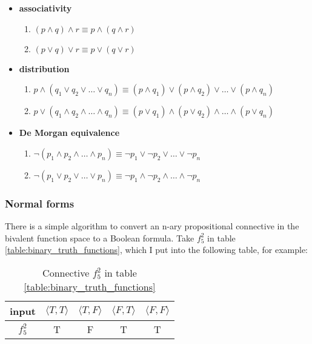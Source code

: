 \documentclass[12pt, letterpaper]{article}
\begin{document}
\begin{itemize}
  \item \textbf{associativity}
    \begin{enumerate}
      \item $(p \land q) \land r \equiv p \land (q \land r)$
      \item $(p \lor q) \lor r \equiv p \lor (q \lor r)$
    \end{enumerate}
  \item \textbf{distribution}
    \begin{enumerate}
      \item $p \land (q_1 \lor q_2 \lor \ldots \lor q_n) \equiv (p \land q_1)
        \lor (p \land q_2) \lor \ldots \lor (p \land q_n)$
      \item $p \lor (q_1 \land q_2 \land \ldots \land q_n) \equiv (p \lor q_1)
        \land (p \lor q_2) \land \ldots \land (p \lor q_n)$
    \end{enumerate}
  \item \textbf{De Morgan equivalence}
    \begin{enumerate}
      \item $\lnot (p_1 \land p_2 \land \ldots \land p_n) \equiv \lnot p_1
        \lor \lnot p_2 \lor \ldots \lor \lnot p_n$
      \item $\lnot (p_1 \lor p_2 \lor \ldots \lor p_n) \equiv \lnot p_1
        \land \lnot p_2 \land \ldots \land \lnot p_n$
    \end{enumerate}
\end{itemize}

\subsubsection{Normal forms}

There is a simple algorithm to convert an n-ary propositional connective in the
bivalent function space to a Boolean formula. Take $f_5^2$ in table
\ref{table:binary_truth_functions}, which I put into the following table, for
example:

\begin{table}[H]
  \centering
  \begin{tabular}{|c|c|c|c|c|}
  \hline
  input      & $\langle T, T \rangle$ & $\langle T, F \rangle$ & $\langle F, T \rangle$ & $\langle F, F \rangle$ \\ [1ex] \hline
  $f_5^2$    & T                      & F                      & T                      & T                      \\ [0.5ex] \hline
  \end{tabular}
  \caption{Connective $f_5^2$ in table \ref{table:binary_truth_functions}}
  \label{table:f52}
\end{table}
\end{document}
